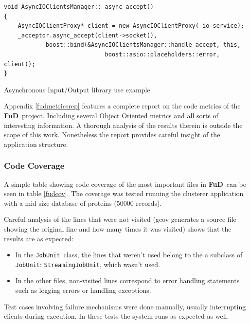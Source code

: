 \documentclass[a4paper,12pt,english]{report}
\newcommand{\fud}{\textbf{FuD}}
\newcommand{\JU}{\texttt{JobUnit}}
\begin{document}
\begin{table}[!htb]
\lstset{language=C++}
\begin{lstlisting}[frame=single]
void AsyncIOClientsManager::_async_accept()
{
    AsyncIOClientProxy* client = new AsyncIOClientProxy(_io_service);
    _acceptor.async_accept(client->socket(),
            boost::bind(&AsyncIOClientsManager::handle_accept, this,
                             boost::asio::placeholders::error, client));
}
\end{lstlisting}
\centering \caption{Asynchronous Input/Output library use example.} \label{asyncaccept}
\end{table}

Appendix \ref{fudmetricsrep} features a complete report on the code metrics of the \fud \ project. Including several Object Oriented metrics and all sorts of interesting information. A thorough analysis of the results therein is outside the scope of this work. Nonetheless the report provides careful insight of the application structure.
  
\subsubsection{Code Coverage}

A simple table showing code coverage of the most important files in \fud \ can be seen in table \ref{fudcov}. The coverage was tested running the clusterer application with a mid-size database of proteins (50000 records). 

Careful analysis of the lines that were not visited (gcov generates a source file showing the original line and how many times it was visited) shows that the results are as expected:
\begin{itemize}
\item In the \JU \ class, the lines that weren't used belong to the a subclass of \JU: \texttt{StreamingJobUnit}, which wasn't used.
\item In the other files, non-visited lines correspond to error handling statements such as logging errors or handling exceptions.
\end{itemize}

Test cases involving failure mechanisms were done manually, usually interrupting clients during execution. In these tests the system runs as expected as well.
\end{document}
